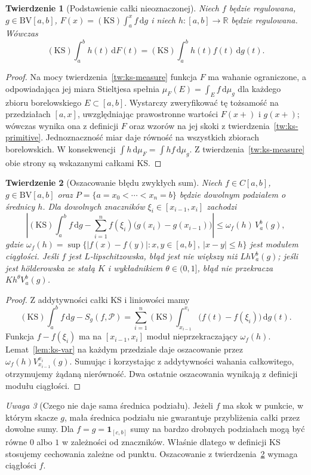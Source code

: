 \documentclass[11pt,a4paper]{article}
\numberwithin{equation}{section}
\theoremstyle{plain}
\newtheorem{twierdzenie}{Twierdzenie}[section]
\theoremstyle{definition}
\theoremstyle{remark}
\newtheorem{uwaga}[twierdzenie]{Uwaga}
\newcommand{\R}{\mathbb R}
\newcommand{\ind}[1]{\mathbf 1_{#1}}
\newcommand{\BV}{\mathrm{BV}}
\newcommand{\KS}{\mathrm{KS}}
\begin{document}
\begin{twierdzenie}[Podstawienie całki nieoznaczonej]
\label{tw:ks-chain}
Niech $f$ będzie regulowana, $g\in\BV[a,b]$, $F(x)=(\KS)\int_a^x f\,\mathrm dg$ i niech $h:[a,b]\to\R$ będzie regulowana. Wówczas
\[
 (\KS)\int_a^b h(t)\,\mathrm dF(t)
 =(\KS)\int_a^b h(t)f(t)\,\mathrm dg(t).
\]
\end{twierdzenie}
\begin{proof}
Na mocy twierdzenia~\ref{tw:ks-measure} funkcja $F$ ma wahanie ograniczone, a odpowiadająca jej miara Stieltjesa spełnia $\mu_F(E)=\int_E f\,\mathrm d\mu_g$ dla każdego zbioru borelowskiego $E\subset[a,b]$. Wystarczy zweryfikować tę tożsamość na przedziałach $[a,x]$, uwzględniając prawostronne wartości $F(x+)$ i $g(x+)$; wówczas wynika ona z definicji $F$ oraz wzorów na jej skoki z twierdzenia~\ref{tw:ks-primitive}. Jednoznaczność miar daje równość na wszystkich zbiorach borelowskich. W konsekwencji $\int h\,\mathrm d\mu_F=\int hf\,\mathrm d\mu_g$. Z twierdzenia~\ref{tw:ks-measure} obie strony są wskazanymi całkami KS.
\end{proof}

\begin{twierdzenie}[Oszacowanie błędu zwykłych sum]
\label{tw:ks-quadrature}
Niech $f\in C[a,b]$, $g\in\BV[a,b]$ oraz $P=\{a=x_0<\cdots<x_n=b\}$ będzie dowolnym podziałem o średnicy $h$. Dla dowolnych znaczników $\xi_i\in[x_{i-1},x_i]$ zachodzi
\[
 \left|(\KS)\int_a^b f\,\mathrm dg-
 \sum_{i=1}^n f(\xi_i)\bigl(g(x_i)-g(x_{i-1})\bigr)\right|
 \le\omega_f(h)\,V_a^b(g),
\]
gdzie $\omega_f(h)=\sup\{|f(x)-f(y)|:x,y\in[a,b],\ |x-y|\le h\}$ jest modułem ciągłości. Jeśli $f$ jest $L$-lipschitzowska, błąd jest nie większy niż $LhV_a^b(g)$; jeśli jest h\"olderowska ze stałą $K$ i wykładnikiem $\theta\in(0,1]$, błąd nie przekracza $Kh^\theta V_a^b(g)$.
\end{twierdzenie}
\begin{proof}
Z addytywności całki KS i liniowości mamy
\[
 (\KS)\int_a^b f\,\mathrm dg-S_g(f,\mathcal P)
 =\sum_{i=1}^n(\KS)\int_{x_{i-1}}^{x_i}\bigl(f(t)-f(\xi_i)\bigr)\,\mathrm dg(t).
\]
Funkcja $f-f(\xi_i)$ ma na $[x_{i-1},x_i]$ moduł nieprzekraczający $\omega_f(h)$. Lemat~\ref{lem:ks-var} na każdym przedziale daje oszacowanie przez $\omega_f(h)V_{x_{i-1}}^{x_i}(g)$. Sumując i korzystając z addytywności wahania całkowitego, otrzymujemy żądaną nierówność. Dwa ostatnie oszacowania wynikają z definicji modułu ciągłości.
\end{proof}

\begin{uwaga}[Czego nie daje sama średnica podziału]
Jeżeli $f$ ma skok w punkcie, w którym skacze $g$, mała średnica podziału nie gwarantuje przybliżenia całki przez dowolne sumy. Dla $f=g=\ind{[c,b]}$ sumy na bardzo drobnych podziałach mogą być równe $0$ albo $1$ w zależności od znaczników. Właśnie dlatego w definicji KS stosujemy cechowania zależne od punktu. Oszacowanie z twierdzenia~\ref{tw:ks-quadrature} wymaga ciągłości $f$.
\end{uwaga}
\end{document}
